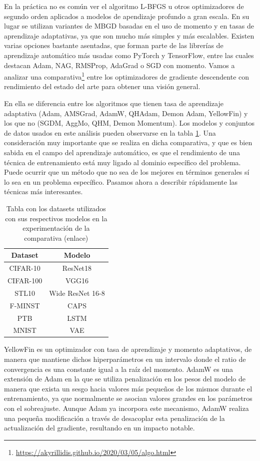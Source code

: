 En la práctica no es común ver el algoritmo L-BFGS u otros optimizadores de segundo orden aplicados a modelos de apendizaje profundo a gran escala. En su lugar se utilizan variantes de MBGD basadas en el uso de momento y en tasas de aprendizaje adaptativas, ya que son mucho más simples y más escalables. Existen varias opciones bastante asentadas, que forman parte de las librerías de aprendizaje automático más usadas como PyTorch y TensorFlow, entre las cuales destacan Adam, NAG, RMSProp, AdaGrad o SGD con momento. Vamos a analizar una comparativa\footnote{\url{https://akyrillidis.github.io/2020/03/05/algo.html}} entre los optimizadores de gradiente descendente con rendimiento del estado del arte para obtener una visión general.

En ella se diferencia entre los algoritmos que tienen tasa de aprendizaje adaptativa (Adam, AMSGrad, AdamW, QHAdam, Demon Adam, YellowFin) y los que no (SGDM, AggMo, QHM, Demon Momentum). Los modelos y conjuntos de datos usados en este análisis pueden observarse en la tabla \ref{table:exp}. Una consideración muy importante que se realiza en dicha comparativa, y que es bien sabida en el campo del aprendizaje automático, es que el rendimiento de una técnica de entrenamiento está muy ligado al dominio específico del problema. Puede ocurrir que un método que no sea de los mejores en términos generales sí lo sea en un problema específico. Pasamos ahora a describir rápidamente las técnicas más interesantes.

\begin{table}[]
\begin{tabular}{|c|c|}
\hline
\textbf{Dataset} & \textbf{Modelo}  \\ \hline
CIFAR-10          & ResNet18         \\ \hline
CIFAR-100         & VGG16            \\ \hline
STL10            & Wide ResNet 16-8 \\ \hline
F-MINST           & CAPS             \\ \hline
PTB              & LSTM             \\ \hline
MNIST            & VAE              \\ \hline
\end{tabular}
\caption{Tabla con los datasets utilizados con sus respectivos modelos en la experimentación de la comparativa (enlace)}
\label{table:exp}
\end{table}

YellowFin \cite{yellowfin} es un optimizador con tasa de aprendizaje y momento adaptativos, de manera que mantiene dichos hiperparámetros en un intervalo donde el ratio de convergencia es una constante igual a la raíz del momento. AdamW es una extensión de Adam en la que se utiliza penalización en los pesos del modelo de manera que exista un sesgo hacia valores más pequeños de los mismos durante el entrenamiento, ya que normalmente se asocian valores grandes en los parámetros con el sobreajuste. Aunque Adam ya incorpora este mecanismo, AdamW realiza una pequeña modificación a través de desacoplar esta penalización de la actualización del gradiente, resultando en un impacto notable. 


